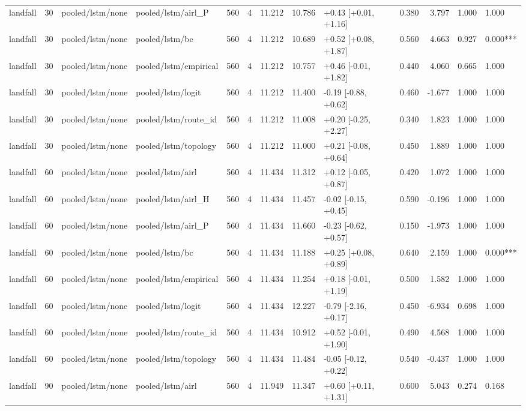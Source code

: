 \begin{tabular}{lrllrrrrlrrll}
landfall & 30 & pooled/lstm/none & pooled/lstm/airl_P & 560 & 4 & 11.212 & 10.786 & +0.43 [+0.01, +1.16] & 0.380 & 3.797 & 1.000 & 1.000 \\
landfall & 30 & pooled/lstm/none & pooled/lstm/bc & 560 & 4 & 11.212 & 10.689 & +0.52 [+0.08, +1.87] & 0.560 & 4.663 & 0.927 & 0.000*** \\
landfall & 30 & pooled/lstm/none & pooled/lstm/empirical & 560 & 4 & 11.212 & 10.757 & +0.46 [-0.01, +1.82] & 0.440 & 4.060 & 0.665 & 1.000 \\
landfall & 30 & pooled/lstm/none & pooled/lstm/logit & 560 & 4 & 11.212 & 11.400 & -0.19 [-0.88, +0.62] & 0.460 & -1.677 & 1.000 & 1.000 \\
landfall & 30 & pooled/lstm/none & pooled/lstm/route_id & 560 & 4 & 11.212 & 11.008 & +0.20 [-0.25, +2.27] & 0.340 & 1.823 & 1.000 & 1.000 \\
landfall & 30 & pooled/lstm/none & pooled/lstm/topology & 560 & 4 & 11.212 & 11.000 & +0.21 [-0.08, +0.64] & 0.450 & 1.889 & 1.000 & 1.000 \\
landfall & 60 & pooled/lstm/none & pooled/lstm/airl & 560 & 4 & 11.434 & 11.312 & +0.12 [-0.05, +0.87] & 0.420 & 1.072 & 1.000 & 1.000 \\
landfall & 60 & pooled/lstm/none & pooled/lstm/airl_H & 560 & 4 & 11.434 & 11.457 & -0.02 [-0.15, +0.45] & 0.590 & -0.196 & 1.000 & 1.000 \\
landfall & 60 & pooled/lstm/none & pooled/lstm/airl_P & 560 & 4 & 11.434 & 11.660 & -0.23 [-0.62, +0.57] & 0.150 & -1.973 & 1.000 & 1.000 \\
landfall & 60 & pooled/lstm/none & pooled/lstm/bc & 560 & 4 & 11.434 & 11.188 & +0.25 [+0.08, +0.89] & 0.640 & 2.159 & 1.000 & 0.000*** \\
landfall & 60 & pooled/lstm/none & pooled/lstm/empirical & 560 & 4 & 11.434 & 11.254 & +0.18 [-0.01, +1.19] & 0.500 & 1.582 & 1.000 & 1.000 \\
landfall & 60 & pooled/lstm/none & pooled/lstm/logit & 560 & 4 & 11.434 & 12.227 & -0.79 [-2.16, +0.17] & 0.450 & -6.934 & 0.698 & 1.000 \\
landfall & 60 & pooled/lstm/none & pooled/lstm/route_id & 560 & 4 & 11.434 & 10.912 & +0.52 [-0.01, +1.90] & 0.490 & 4.568 & 1.000 & 1.000 \\
landfall & 60 & pooled/lstm/none & pooled/lstm/topology & 560 & 4 & 11.434 & 11.484 & -0.05 [-0.12, +0.22] & 0.540 & -0.437 & 1.000 & 1.000 \\
landfall & 90 & pooled/lstm/none & pooled/lstm/airl & 560 & 4 & 11.949 & 11.347 & +0.60 [+0.11, +1.31] & 0.600 & 5.043 & 0.274 & 0.168 \\

\end{tabular}

